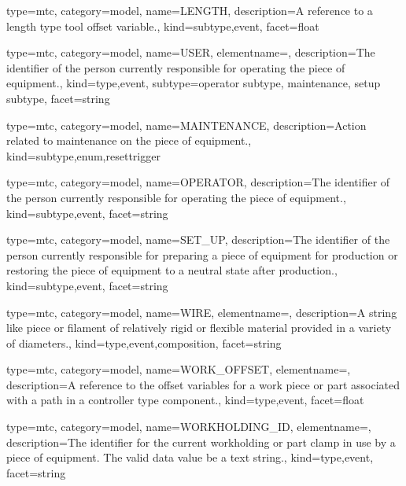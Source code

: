 {
  type=mtc,
  category=model,
  name={LENGTH},
  description={A reference to a length type tool offset variable.},
  kind={subtype,event},
  facet={\gls{float}}
}


{
  type=mtc,
  category=model,
  name={USER},
  elementname=,
  description={The identifier of the person currently responsible for operating the piece of equipment.},
  kind={type,event},
  subtype={\gls{operator subtype}, \gls{maintenance}, \gls{setup subtype}},
  facet={\gls{string}}
}


{
  type=mtc,
  category=model,
  name={MAINTENANCE},
  description={Action related to maintenance on the piece of equipment.},
  kind={subtype,enum,resettrigger}
}


{
  type=mtc,
  category=model,
  name={OPERATOR},
  description={The identifier of the person currently responsible for operating the piece of equipment.},
  kind={subtype,event},
  facet={\gls{string}}
}


{
  type=mtc,
  category=model,
  name={SET\_UP},
  description={The identifier of the person currently responsible for preparing a piece of equipment for production or restoring the piece of equipment to a neutral state after production.},
  kind={subtype,event},
  facet={\gls{string}}
}


{
  type=mtc,
  category=model,
  name={WIRE},
  elementname=,
  description={A string like piece or filament of relatively rigid or flexible material provided in a variety of diameters.},
  kind={type,event,composition},
  facet={\gls{string}}
}


{
  type=mtc,
  category=model,
  name={WORK\_OFFSET},
  elementname=,
  description={A reference to the offset variables for a work piece or part associated with a \gls{path} in a \gls{controller} type component.},
  kind={type,event},
  facet={\gls{float}}
}


{
  type=mtc,
  category=model,
  name={WORKHOLDING\_ID},
  elementname=,
  description={The identifier for the current workholding or part clamp in use by a piece of equipment. \newline The \gls{valid data value} \must be a text string.},
  kind={type,event},
  facet={\gls{string}}
}



